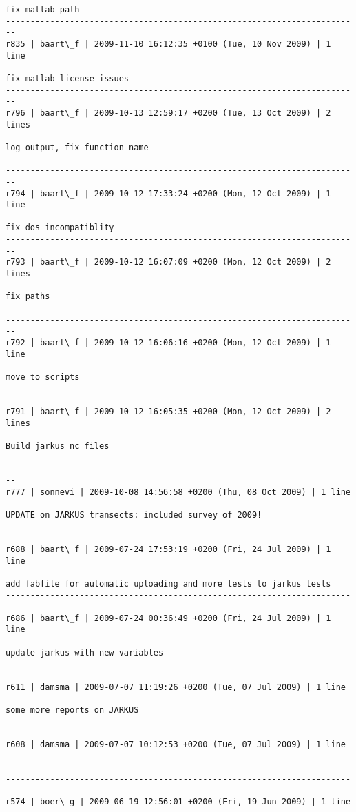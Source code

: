 \documentclass[9]{report}
\begin{document}
\begin{description}
\begin{verbatim}
fix matlab path
------------------------------------------------------------------------
r835 | baart\_f | 2009-11-10 16:12:35 +0100 (Tue, 10 Nov 2009) | 1 line

fix matlab license issues
------------------------------------------------------------------------
r796 | baart\_f | 2009-10-13 12:59:17 +0200 (Tue, 13 Oct 2009) | 2 lines

log output, fix function name

------------------------------------------------------------------------
r794 | baart\_f | 2009-10-12 17:33:24 +0200 (Mon, 12 Oct 2009) | 1 line

fix dos incompatiblity
------------------------------------------------------------------------
r793 | baart\_f | 2009-10-12 16:07:09 +0200 (Mon, 12 Oct 2009) | 2 lines

fix paths

------------------------------------------------------------------------
r792 | baart\_f | 2009-10-12 16:06:16 +0200 (Mon, 12 Oct 2009) | 1 line

move to scripts
------------------------------------------------------------------------
r791 | baart\_f | 2009-10-12 16:05:35 +0200 (Mon, 12 Oct 2009) | 2 lines

Build jarkus nc files

------------------------------------------------------------------------
r777 | sonnevi | 2009-10-08 14:56:58 +0200 (Thu, 08 Oct 2009) | 1 line

UPDATE on JARKUS transects: included survey of 2009!
------------------------------------------------------------------------
r688 | baart\_f | 2009-07-24 17:53:19 +0200 (Fri, 24 Jul 2009) | 1 line

add fabfile for automatic uploading and more tests to jarkus tests
------------------------------------------------------------------------
r686 | baart\_f | 2009-07-24 00:36:49 +0200 (Fri, 24 Jul 2009) | 1 line

update jarkus with new variables
------------------------------------------------------------------------
r611 | damsma | 2009-07-07 11:19:26 +0200 (Tue, 07 Jul 2009) | 1 line

some more reports on JARKUS
------------------------------------------------------------------------
r608 | damsma | 2009-07-07 10:12:53 +0200 (Tue, 07 Jul 2009) | 1 line


------------------------------------------------------------------------
r574 | boer\_g | 2009-06-19 12:56:01 +0200 (Fri, 19 Jun 2009) | 1 line


\end{verbatim}
\end{description}
\end{document}
